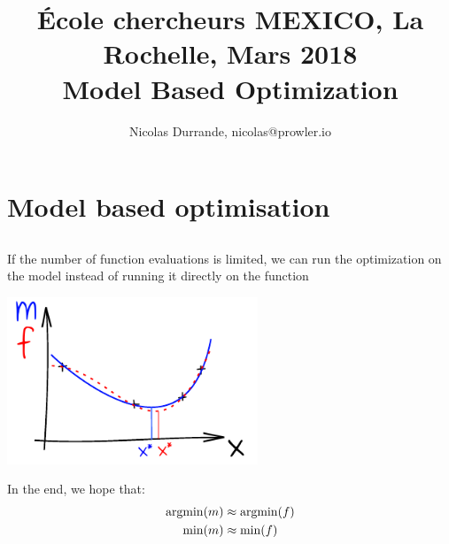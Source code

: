 \documentclass{beamer}
\title[\'Ecole chercheurs MEXICO]{ \small \'Ecole chercheurs MEXICO, La Rochelle, Mars 2018\\ \vspace{3mm} \LARGE Model Based Optimization}
\author[\quad La Rochelle, March 2018]{Nicolas Durrande, nicolas@prowler.io}
\institute[]{PROWLER.io, Cambridge (UK) -- Mines St-\'Etienne (France)}
\date{\null}
\newcommand{\argmin}{\operatornamewithlimits{argmin}}
\begin{document}
\begin{frame}
  \titlepage
\end{frame}


\section{Model based optimisation}
\subsection{}


\begin{frame}{}
If the number of function evaluations is limited, we can run the optimization on the model instead of running it directly on the function
\begin{center}
\includegraphics[height=5cm]{figures/ink_mf}
\end{center}
In the end, we hope that:
\begin{equation*}
	\begin{split}
		\argmin(m) & \approx \argmin(f)\\
		\min(m) & \approx \min(f)\\
	\end{split}
\end{equation*}
\end{frame}
\end{document}
